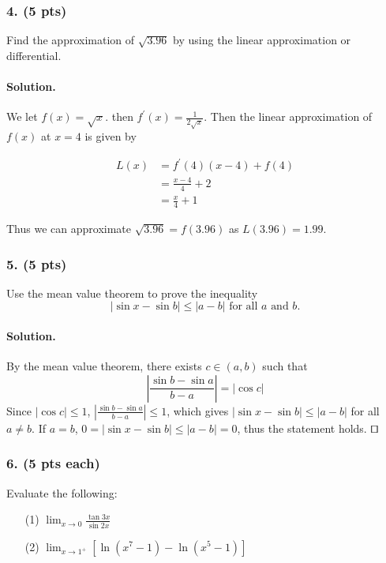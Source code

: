 \subsubsection{4. (5 pts)} Find the approximation of $\sqrt{3.96}$ by using the linear approximation or differential.

\paragraph{Solution.} We let $f\left(x\right) = \sqrt{x}$. then $\displaystyle f^\prime\left(x\right) = \frac{1}{2\sqrt{x}}$. Then the linear approximation of $f\left(x\right)$ at $x = 4$ is given by

\begin{align*}
	L\left(x\right) &= f^\prime\left(4\right)\left(x - 4\right) + f\left(4\right)\\
	&= \frac{x - 4}{4} + 2\\
	&= \frac{x}{4} + 1
\end{align*}

Thus we can approximate $\sqrt{3.96} = f\left(3.96\right)$ as $L\left(3.96\right) = 1.99$.

\subsubsection{5. (5 pts)} Use the mean value theorem to prove the inequality \[\left|\sin x - \sin b\right| \leq \left|a - b\right| \textrm{ for all } a \textrm{ and } b.\]

\paragraph{Solution.} By the mean value theorem, there exists $c \in \left(a, b\right)$ such that \[\left|\frac{\sin b - \sin a}{b - a}\right| = \left|\cos c\right|\]
Since $\left|\cos c\right| \leq 1$, $\displaystyle \left|\frac{\sin b - \sin a}{b - a}\right| \leq 1$, which gives $\left|\sin x - \sin b\right| \leq \left|a - b\right|$ for all $a \neq b$. If $a = b$, $0 = \left|\sin x - \sin b\right| \leq \left|a - b\right| = 0$, thus the statement holds. $\qed$

\subsubsection{6. (5 pts each)} Evaluate the following:
\begin{itemize}
	\item [(1)] $\displaystyle \lim_{x\rightarrow 0}\frac{\tan 3x}{\sin 2x}$
	\item [(2)] $\displaystyle \lim_{x\rightarrow1^+}\left[\ln\left(x^7-1\right)-\ln\left(x^5-1\right)\right]$
\end{itemize}

